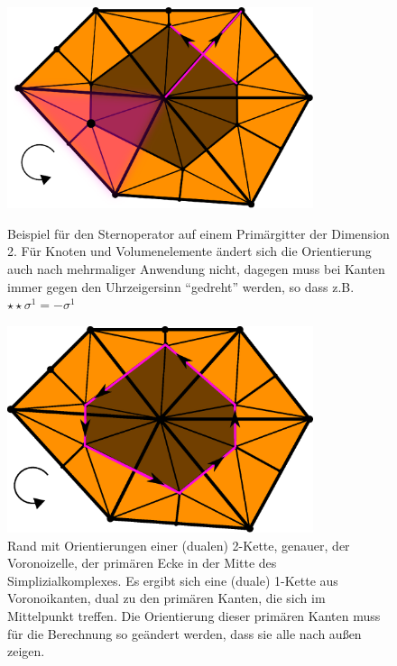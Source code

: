   \begin{figure}
    \centering\includegraphics[width=0.8\textwidth]{bilder/dualSigma0.eps}
    \caption[Bsp. Sternoperator in 2D]{Beispiel für den Sternoperator auf einem Primärgitter der Dimension 2.
                                       Für Knoten und Volumenelemente ändert sich die Orientierung auch nach mehrmaliger Anwendung nicht,
                                       dagegen muss bei Kanten immer gegen den Uhrzeigersinn "`gedreht"' werden, so dass z.B. \( \star\star\sigma^{1} = -\sigma^{1} \)}
    \label{figBspSternoperator2D}
    \vspace{1cm}
    \centering\includegraphics[width=0.8\textwidth]{bilder/dualSigmaRand.eps}
    \caption[Bsp. Randoperator auf (dualen) 2-Kette]{Rand mit Orientierungen einer (dualen) 2-Kette, genauer, der Voronoizelle, der primären Ecke in der Mitte des Simplizialkomplexes.
                                                     Es ergibt sich eine (duale) 1-Kette aus Voronoikanten, dual zu den primären Kanten, die sich im Mittelpunkt treffen.
                                                     Die Orientierung dieser primären Kanten muss für die Berechnung so geändert werden, dass sie alle nach außen zeigen.}
    \label{figBspRandAufDualZelle}
  \end{figure}

